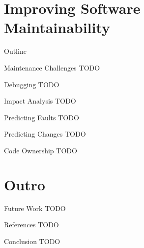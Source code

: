 

\section{Improving Software Maintainability}

\begin{frame}{Outline}
  \tableofcontents[current]
\end{frame}


\begin{frame}{Maintenance Challenges}
  TODO
\end{frame}


\begin{frame}{Debugging}
  TODO
\end{frame}


\begin{frame}{Impact Analysis}
  TODO
\end{frame}


\begin{frame}{Predicting Faults}
  TODO
\end{frame}


\begin{frame}{Predicting Changes}
  TODO
\end{frame}


\begin{frame}{Code Ownership}
  TODO
\end{frame}



\section*{Outro}

\begin{frame}{Future Work}
  TODO
\end{frame}


\begin{frame}{References}
  TODO
\end{frame}


\begin{frame}{Conclusion}
  TODO
\end{frame}



